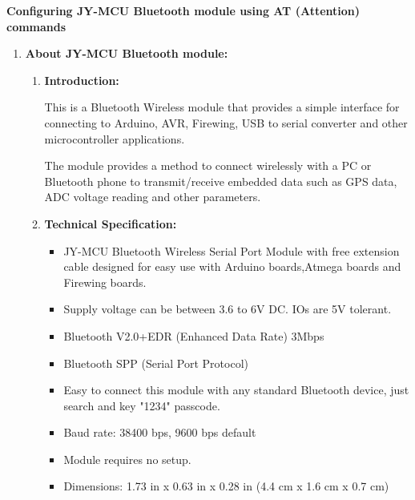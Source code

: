 \documentclass[12pt]{article}
\author{Omkar Mohite}
\title{}
\begin{document}
\begin{center}

\textbf{{\LARGE Configuring JY-MCU Bluetooth module using AT (Attention)
commands}}
\end{center}
\begin{enumerate}
	\item \textbf{{\large About JY-MCU Bluetooth module:}}

\begin{enumerate}
	\item \textbf{Introduction:}



This is a Bluetooth Wireless module that provides a simple interface for
connecting to Arduino, AVR, Firewing, USB to serial converter and other
microcontroller applications.

The module provides a method to connect wirelessly with a PC or Bluetooth phone
to transmit/receive embedded data such as GPS data, ADC voltage reading and other
parameters.


	\item \textbf{Technical Specification:}


\begin{itemize}
	\item JY-MCU Bluetooth Wireless Serial Port Module with free extension cable designed
for easy use with Arduino boards,Atmega boards and Firewing boards.	
\item Supply voltage can be between 3.6 to 6V DC. IOs are 5V tolerant. 
	\item Bluetooth V2.0+EDR (Enhanced Data Rate) 3Mbps 
	\item Bluetooth SPP (Serial Port Protocol) 
	\item Easy to connect this module with any standard Bluetooth device, just search and key "1234" passcode. 
	\item Baud rate: 38400 bps, 9600 bps default
	\item Module requires no setup. 
	\item Dimensions: 1.73 in x 0.63 in x 0.28 in (4.4 cm x 1.6 cm x 0.7 cm) 
\end{itemize}


\end{enumerate}
\end{enumerate}
\end{document}
